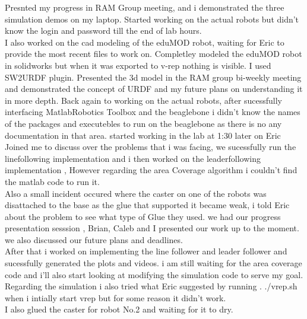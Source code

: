 \documentclass[fontsize=11pt, %
                             paper=letter, %
                             twoside, %
                             captions=tableheading,
                             index=totoc,
                             hyperref]{labbook}
\begin{document}
\begin{addmargin}[0cm]{0cm}
Presnted my progress in RAM Group meeting, and i demonstrated the three simulation demos on my laptop.
Started working on the actual robots but didn't know the login and password till the end of lab hours.
\\ I also worked on the cad modeling of the eduMOD robot, waiting for Eric to provide the most recent files to work on. 
Completley modeled the eduMOD robot in solidworks but when it was exported to v-rep nothing is visible. I used SW2URDF plugin.
Presented the 3d model in the RAM group bi-weekly meeting and demonstrated the concept of URDF and my future plans on understanding it in more depth. 
 Back again to working on the actual robots, after sucessfully interfacing MatlabRobotics Toolbox and the beaglebone i didn't know the names of the packages and executebles to run on the beaglebone as there is no any documentation in that area. 
 started working in the lab at 1:30 later on Eric Joined me to discuss over the problems that i was facing, we sucessfully run the linefollowing implementation and i then worked on the leaderfollowing implementation , However regarding the area Coverage algorithm i couldn't find the matlab code to run it. 
 \\ Also a small incident occured where the caster on one of the robots was disattached to the base as the glue that supported it became weak, i told Eric about the problem to see what type of Glue they used.
we had our progress presentation sesssion , Brian, Caleb and I presented our work up to the moment. we also discussed our future plans and deadlines. 
\\ After that i worked on implementing the line follower and leader follower and sucessfully generated the plots and videos. i am still waiting for the area coverage code and i'll also start looking at modifying the simulation code to serve my goal. 
\\Regarding the simulation i also tried what Eric suggested by running . ./vrep.sh when i intially start vrep but for some reason it didn't work. 
\\ I also glued the caster for robot No.2 and waiting for it to dry. 
\end{addmargin}
\end{document}
